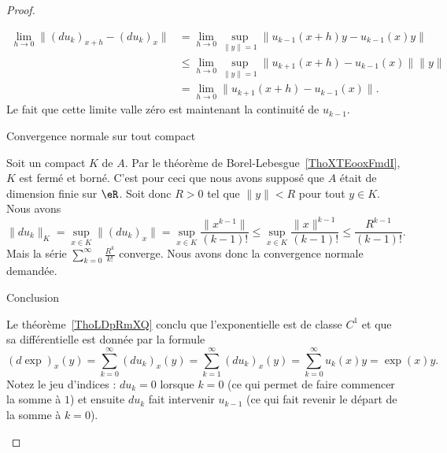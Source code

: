 \begin{proof}
\begin{subproof}
		\begin{subequations}
			\begin{align}
				\lim_{h\to 0} \| (du_k)_{x+h}-(du_k)_x \| & =\lim_{h\to 0} \sup_{\| y \|=1}\| u_{k-1}(x+h)y-u_{k-1}(x)y \|         \\
				                                          & \leq\lim_{h\to 0} \sup_{\| y \|=1}\| u_{k+1}(x+h)-u_{k-1}(x) \|\| y \| \\
				                                          & =\lim_{h\to 0} \| u_{k+1}(x+h)-u_{k-1}(x) \|.
			\end{align}
		\end{subequations}
		Le fait que cette limite valle zéro est maintenant la continuité de \( u_{k-1}\).

		\item[Convergence normale sur tout compact]

		Soit un compact \( K\) de \( A\). Par le théorème de Borel-Lebesgue~\ref{ThoXTEooxFmdI}, \( K\) est fermé et borné. C'est pour ceci que nous avons supposé que \( A\) était de dimension finie sur \( \eR\). Soit donc \( R>0\) tel que \( \| y \|<R\) pour tout \( y\in K\). Nous avons
		\begin{equation}
			\| du_k \|_K=\sup_{x\in K}\| (du_k)_x \|=\sup_{x\in K}\frac{ \| x^{k-1} \| }{ (k-1)! }\leq \sup_{x\in K}\frac{ \| x \|^{k-1} }{ (k-1)! }\leq \frac{ R^{k-1} }{ (k-1)! }.
		\end{equation}
		Mais la série \( \sum_{k=0}^{\infty}\frac{ R^k }{k!}\) converge. Nous avons donc la convergence normale demandée.

		\item[Conclusion]

		Le théorème~\ref{ThoLDpRmXQ} conclu que l'exponentielle est de classe \( C^1\) et que sa différentielle est donnée par la formule
		\begin{equation}
			(d\exp)_x(y)=\sum_{k=0}^{\infty}(du_k)_x(y)=\sum_{k=1}^{\infty}(du_k)_x(y)=\sum_{k=0}^{\infty}u_k(x)y=\exp(x)y.
		\end{equation}
		Notez le jeu d'indices : \( du_k=0\) lorsque \( k=0\) (ce qui permet de faire commencer la somme à \( 1\)) et ensuite \( du_k\) fait intervenir \( u_{k-1}\) (ce qui fait revenir le départ de la somme à \( k=0\)).

	\end{subproof}
\end{proof}

